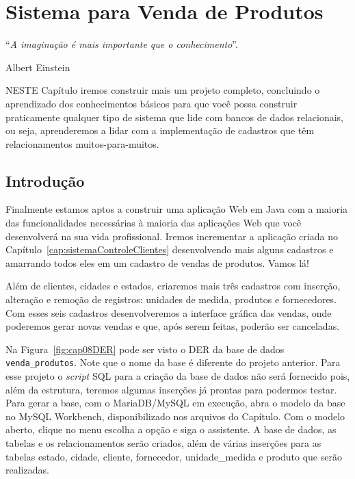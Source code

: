 \chapter{Sistema para Venda de Produtos}\label{cap:sistemaVendaProdutos}
\epigraph{``\textit{A imaginação é mais importante que o conhecimento}''.}{Albert Einstein}

\lettrine[lines=4, lhang=0.1, lraise=0, loversize=0.2, findent=0.1em]{\textcolor{corTema}{N}}{ESTE} Capítulo iremos construir mais um projeto completo, concluindo o aprendizado dos conhecimentos básicos para que você possa construir praticamente qualquer tipo de sistema que lide com bancos de dados relacionais, ou seja, aprenderemos a lidar com a implementação de cadastros que têm relacionamentos muitos-para-muitos.


\section{Introdução}

Finalmente estamos aptos a construir uma aplicação Web em Java com a maioria das funcionalidades necessárias à maioria das aplicações Web que você desenvolverá na sua vida profissional. Iremos incrementar a aplicação criada no Capítulo~\ref{cap:sistemaControleClientes} desenvolvendo mais alguns cadastros e amarrando todos eles em um cadastro de vendas de produtos. Vamos lá!

Além de clientes, cidades e estados, criaremos mais três cadastros com inserção, alteração e remoção de registros: unidades de medida, produtos e fornecedores. Com esses seis cadastros desenvolveremos a interface gráfica das vendas, onde poderemos gerar novas vendas e que, após serem feitas, poderão ser canceladas.

Na Figura~\ref{fig:cap08DER} pode ser visto o DER da base de dados \texttt{venda\_produtos}. Note que o nome da base é diferente do projeto anterior. Para esse projeto o \textit{script} SQL para a criação da base de dados não será fornecido pois, além da estrutura, teremos algumas inserções já prontas para podermos testar. Para gerar a base, com o MariaDB/MySQL em execução, abra o modelo da base no MySQL Workbench, disponibilizado nos arquivos do Capítulo. Com o modelo aberto, clique no menu  escolha a opção  e siga o assistente. A base de dados, as tabelas e os relacionamentos serão criados, além de várias inserções para as tabelas estado, cidade, cliente, fornecedor, unidade\_medida e produto que serão realizadas.


